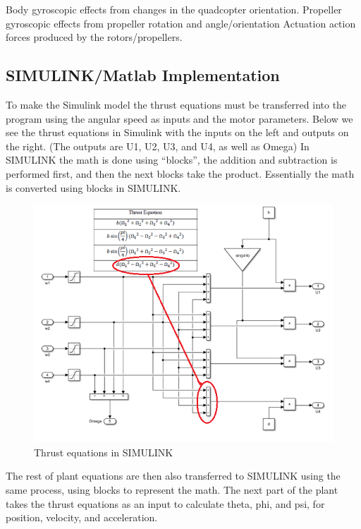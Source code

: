 Body gyroscopic effects from changes in the quadcopter orientation.
Propeller gyroscopic effects from propeller rotation and angle/orientation
Actuation action forces produced by the rotors/propellers.

\subsection{SIMULINK/Matlab Implementation}
To make the Simulink model the thrust equations must be transferred into the program using the angular speed as inputs and the motor parameters. Below we see the thrust equations in Simulink with the inputs on the left and outputs on the right. (The outputs are U1, U2, U3, and U4, as well as Omega) In SIMULINK the math is done using “blocks”, the addition and subtraction is performed first, and then the next blocks take the product. Essentially the math is converted using blocks in SIMULINK.

\begin{figure}[H]
\begin{center}
   \includegraphics[scale =1]{pictures/control/thrust equation in simulink.png}
\end{center}
\caption{Thrust equations in SIMULINK}
\end{figure}

The rest of plant equations are then also transferred to SIMULINK using the same process, using blocks to represent the math. The next part of the plant takes the thrust equations as an input to calculate theta, phi, and psi, for position, velocity, and acceleration.

